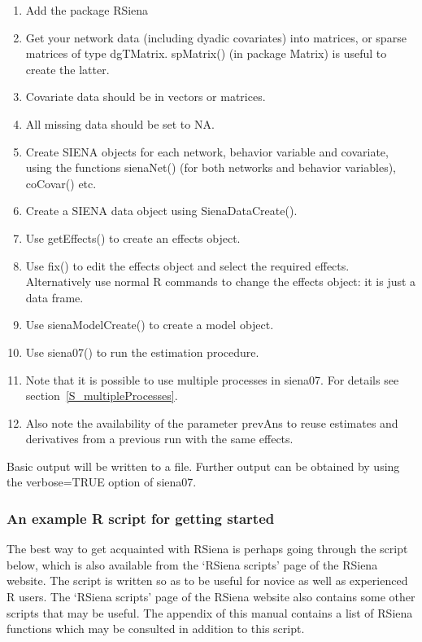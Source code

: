 \documentclass[a4paper,fleqn]{article}
\newcommand{\+}{\, + \,}
\newcommand{\sfn}[1]{\textsf{#1}}
\newcommand{\R}{{\sf R }}
\newcommand{\RS}{{\sf RSiena }}
\newcommand{\SI}{{\sf SIENA }}
\begin{document}
{\begin{enumerate}
\item Add the package \RS
\item Get your network data (including dyadic covariates)
   into matrices, or sparse matrices of type
  \sfn{dgTMatrix}. \sfn{spMatrix()} (in package \sfn{Matrix}) is useful to
  create the latter.
\item Covariate data should be in vectors or matrices.
\item All missing data should be set to NA.
\item Create \SI objects for each network, behavior variable and covariate,
  using the functions \sfn{sienaNet()} (for both networks and behavior
  variables), \sfn{coCovar()} etc.
\item Create a \SI data object using \sfn{SienaDataCreate()}.
\item Use \sfn{getEffects()} to create an effects object.
\item Use \sfn{fix()} to edit the effects object and select the required
  effects. Alternatively use normal \R commands to change the effects object: it
  is just a data frame.
\item Use \sfn{sienaModelCreate()} to create a model object.
\item Use \sfn{siena07()} to run the estimation procedure.
\item Note that it is possible to use multiple processes in \sfn{siena07}. For
  details see section~\ref{S_multipleProcesses}.
\item Also note the availability of the parameter \sfn{prevAns} to reuse
  estimates and derivatives from a previous run with the same effects.
\end{enumerate}
Basic output will be written to a file. Further output can be obtained by using
the \sfn{verbose=TRUE} option of \sfn{siena07}.

\subsubsection{An example \R script for getting started}
\label{S_Rscript}

The best way to get acquainted with \RS is perhaps
going through the script below, which is also available
from the `RSiena scripts' page of the \RS website.
The script is written so as to be useful for novice
as well as experienced \R users.
The `RSiena scripts' page of the \RS website
also contains some other scripts that may be useful.
The appendix of this manual contains a list of \RS functions which may be consulted
in addition to this script.

}
\end{document}
